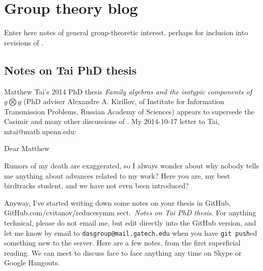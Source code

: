


\chapter{Group theory blog}
\label{c-groupThe}


Enter here notes of general group-theoretic interest, perhaps
for inclusion into revisions of \wwwgt.

\section{Notes on Tai PhD thesis}
\label{s-groupTheBlog}

{Matthew Tai}'s 2014 PhD thesis
{\em Family algebras and the isotypic components of $g \bigotimes g$}
(PhD adviser
{Alexandre A. Kirillov}, of
 Institute for Information Transmission Problems, Russian Academy of Sciences)
appears to supersede the Casimir and many other discussions of {\wwwgt}.
My 2014-10-17 letter to Tai, mtai@math.upenn.edu:

Dear Matthew

Rumors of my death are exaggerated, so I always wonder about why nobody
tells me anything about advances related to my work? Here you are, my
best birdtracks student, and we have not even been introduced?

Anyway, I've started writing down some notes on your thesis in GitHub,
\\
{GitHub.com/cvitanov/reducesymm}
sect.~{\em Notes on Tai PhD thesis}. For anything technical, please do
not email me, but edit directly into the GitHub version, and let me know
by email to \texttt{dasgroup@mail.gatech.edu} when you have \texttt{git
push}ed something new to the server. Here are a few notes, from the first
superficial reading. We can meet to discuss face to face anything any
time on Skype or Google Hangouts.

